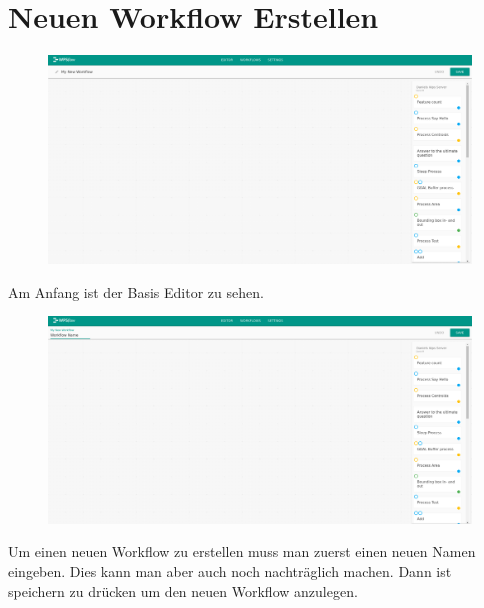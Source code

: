 \chapter{Neuen Workflow Erstellen}
    \begin{figure}[H]
        \centering
        \includegraphics[width=15.5cm]{images/BaseEditor.png}
        \label{base_editor}
    \end{figure}
    Am Anfang ist der Basis Editor zu sehen. 
    \begin{figure}[H]
        \centering
        \includegraphics[width=15.5cm]{images/New Workflow.png}
        \label{new_workflow}
    \end{figure}
    \noindent Um einen neuen Workflow zu erstellen muss man zuerst einen neuen Namen eingeben. Dies kann man aber auch noch nachträglich machen. Dann ist speichern zu drücken um den neuen Workflow anzulegen. 
    
